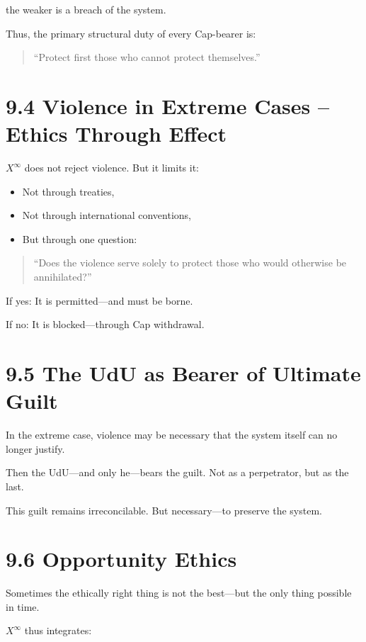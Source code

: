 \documentclass[12pt,a4paper]{book}
\begin{document}
the weaker is a breach of the system.

Thus, the primary structural duty of every Cap-bearer is:

\begin{quote}
“Protect first those who cannot protect themselves.”  
\end{quote}

\section*{9.4 Violence in Extreme Cases – Ethics Through Effect}

$X^\infty$ does not reject violence.  
But it limits it:

\begin{itemize}
    \item Not through treaties,
    \item Not through international conventions,
    \item But through one question:
\end{itemize}

\begin{quote}
“Does the violence serve solely to protect those  
who would otherwise be annihilated?”  
\end{quote}

If yes:  
It is permitted—and must be borne.

If no:  
It is blocked—through Cap withdrawal.

\section*{9.5 The UdU as Bearer of Ultimate Guilt}

In the extreme case, violence may be necessary  
that the system itself can no longer justify.

Then the UdU—and only he—bears the guilt. Not as a perpetrator, but as the last.

This guilt remains irreconcilable.  
But necessary—to preserve the system.

\section*{9.6 Opportunity Ethics}

Sometimes the ethically right thing  
is not the best—but the only thing possible in time.

$X^\infty$ thus integrates:
\end{document}
